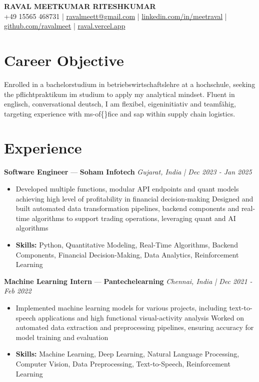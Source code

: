 \documentclass[a4paper,10pt]{article}
\begin{document}
\begin{center}
  {\Large\bfseries RAVAL MEETKUMAR RITESHKUMAR}\\[2pt]
  {\small +49 15565 468731 \;|\; \href{mailto:ravalmeett@gmail.com}{ravalmeett@gmail.com} \;|\; \href{https://www.linkedin.com/in/meetraval/}{linkedin.com/in/meetraval} \;|\; \href{https://github.com/ravalmeet}{github.com/ravalmeet} \;|\; \href{https://raval.vercel.app/}{raval.vercel.app}}
\end{center}
\vspace{-3pt}

\section*{Career Objective}
Enrolled in a bachelorstudium in betriebswirtschaftslehre at a hochschule, seeking the pflichtpraktikum im studium to apply my analytical mindset. Fluent in englisch, conversational deutsch, I am flexibel, eigeninitiativ and teamfähig, targeting experience with ms-of\{\}fice and sap within supply chain logistics.\par

\section*{Experience}
\textbf{Software Engineer} — \textbf{Soham Infotech} \hfill \textit{Gujarat, India \;|\; Dec 2023 - Jan 2025}\par
\vspace{1pt}
\begin{itemize}
  \item Developed multiple functions, modular API endpoints and quant models achieving high level of profitability in financial decision-making Designed and built automated data transformation pipelines, backend components and real-time algorithms to support trading operations, leveraging quant and AI algorithms
  \item \textbf{Skills:} Python, Quantitative Modeling, Real-Time Algorithms, Backend Components, Financial Decision-Making, Data Analytics, Reinforcement Learning
\end{itemize}
\vspace{3pt}
\textbf{Machine Learning Intern} — \textbf{Pantechelearning} \hfill \textit{Chennai, India \;|\; Dec 2021 - Feb 2022}\par
\vspace{1pt}
\begin{itemize}
  \item Implemented machine learning models for various projects, including text-to-speech applications and high functional visual-activity analysis Worked on automated data extraction and preprocessing pipelines, ensuring accuracy for model training and evaluation
  \item \textbf{Skills:} Machine Learning, Deep Learning, Natural Language Processing, Computer Vision, Data Preprocessing, Text-to-Speech, Reinforcement Learning
\end{itemize}
\end{document}

